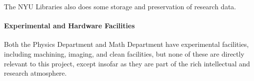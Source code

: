 The NYU Libraries also does some storage and preservation of research data.

\paragraph{Experimental and Hardware Facilities}
Both the Physics Department and Math Department have experimental facilities, including machining, imaging, and clean facilities, but none of these are directly relevant to this project, except insofar as they are part of the rich intellectual and research atmosphere.
